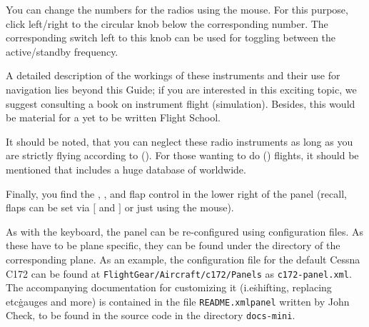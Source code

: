 You can change the numbers for the radios using the mouse. For this
purpose, click left/right to the circular knob below the corresponding
number. The corresponding switch left to this knob can be used for
toggling between the active/standby frequency.

A detailed description of the workings of these instruments and their use for
navigation
lies beyond this Guide; if you are interested in this exciting topic, we suggest
consulting a book on instrument flight (simulation). Besides, this would be
material for
a yet to be written \FlightGear{} Flight School.

It should be noted, that you can neglect these radio instruments as
long as you are strictly flying according to  (). For those wanting to do  () flights, it should be mentioned that \FlightGear{}
includes a huge database of  worldwide.

Finally, you find the , , and flap
control in
the lower right of the panel (recall, flaps can be set via $[$ and $]$ or just
using the mouse).

As with the keyboard, the panel can be
re-configured using
configuration files. As these have to be plane specific, they can be found under
the
directory of the corresponding plane. As an example, the configuration file for
the
default Cessna C172 can be found at \texttt{FlightGear/Aircraft/c172/Panels} as
\texttt{c172-panel.xml}. The accompanying documentation for customizing it
(i.e\. shifting,
replacing etc\. gauges and more) is contained in the file
\texttt{README.xmlpanel}
written by John Check,
to be found in the source code in the directory \texttt{docs-mini}.

\medskip

\centerline{}

